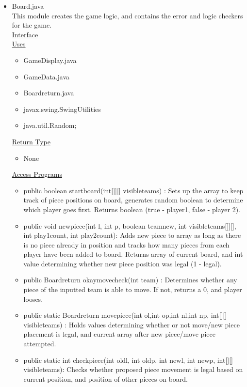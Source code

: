 \documentclass[12pt]{article}
\begin{document}
\begin{itemize}
\item Board.java \\
This module creates the game logic, and contains the error and logic checkers for the game. \\
\underline{Interface} \\
\underline{Uses}
\begin{itemize}
	\item GameDisplay.java
	\item GameData.java
	\item Boardreturn.java
	\item javax.swing.SwingUtilities
	\item java.util.Random;
\end{itemize} 
\underline{Return Type}
\begin{itemize}
	\item None
\end{itemize}
\underline{Access Programs}
\begin{itemize}
	\item public boolean startboard(int[]][] visibleteams) : Sets up the array to keep track of piece positions on board, generates random boolean to determine which player goes first. Returns boolean (true - player1, false - player 2).
	\item public void newpiece(int l, int p, boolean teamnew, int visibleteams[]][], int play1count, int play2count): Adds new piece to array as long as there is no piece already in position and tracks how many pieces from each player have been added to board. Returns array of current board, and int value determining whether new piece position was legal (1 - legal).
	\item public Boardreturn okaymovecheck(int team) : Determines whether any piece of the inputted team is able to move. If not, returns a 0, and player looses.
	\item public static Boardreturn movepiece(int ol,int op,int nl,int np, int[][] visibleteams) : Holds values determining whether or not move/new piece placement is legal, and current array after new piece/move piece attempted. 
	\item public static int checkpiece(int oldl, int oldp, int newl, int newp, int[][] visibleteams): Checks whether proposed piece movement is legal based on current position, and position of other pieces on board.
	

\end{itemize}
\end{itemize}
\end{document}
